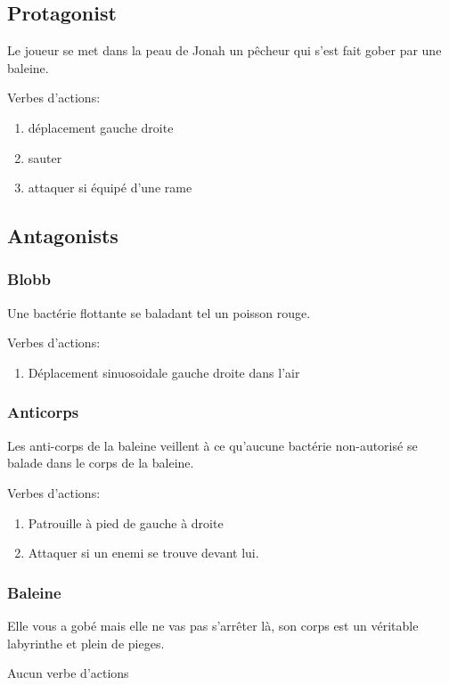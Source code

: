\documentclass{prologArticle}
\begin{document}
\subsection{Protagonist}

Le joueur se met dans la peau de Jonah un pêcheur qui s'est fait gober par une baleine.

Verbes d'actions:
\begin{enumerate}
    \item déplacement gauche droite
    \item sauter
    \item attaquer si équipé d'une rame
\end{enumerate}

\subsection{Antagonists}

\subsubsection{Blobb}
Une bactérie flottante se baladant tel un poisson rouge.

Verbes d'actions:
\begin{enumerate}
    \item Déplacement sinuosoidale gauche droite dans l'air
\end{enumerate}

\subsubsection{Anticorps}
Les anti-corps de la baleine veillent à ce qu'aucune bactérie non-autorisé se balade dans le corps de la baleine.

Verbes d'actions:
\begin{enumerate}
    \item Patrouille à pied de gauche à droite
    \item Attaquer si un enemi se trouve devant lui.
\end{enumerate}

\subsubsection{Baleine}
Elle vous a gobé mais elle ne vas pas s'arrêter là, son corps est un véritable labyrinthe et plein de pieges.

Aucun verbe d'actions
\end{document}
